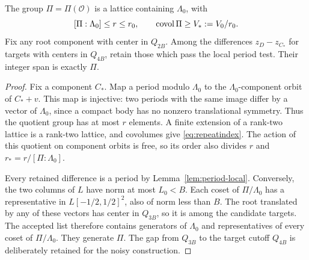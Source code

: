 \begin{lemma}
\label{lem:repeatgroup}
The group $\Pi=\Pi(\mathcal O)$ is a lattice containing $\Lambda_0$,
with
\begin{equation}\label{eq:repeatindex}
              [\Pi:\Lambda_0]\le r\le r_0,
       \qquad \operatorname{covol}\Pi\ge V_*:=V_0/r_0.
\end{equation}
Fix any root component with center in $Q_{2B}$. Among the differences
$z_D-z_{C_*}$ for targets with centers in $Q_{4B}$, retain those which
pass the local period test. Their integer span is exactly $\Pi$.
\end{lemma}
\begin{proof}
Fix a component $C_*$. Map a period modulo $\Lambda_0$ to the
$\Lambda_0$-component orbit of $C_*+v$. This map is injective: two periods
with the same image differ by a vector of $\Lambda_0$, since a compact
body has no nonzero translational symmetry. Thus the quotient group
has at most $r$ elements. A finite extension of a rank-two lattice is
a rank-two lattice, and covolumes give \eqref{eq:repeatindex}.
The action of this quotient on component orbits is free, so its order
also divides $r$ and $r_*=r/[\Pi:\Lambda_0]$.

Every retained difference is a period by Lemma~\ref{lem:period-local}.
Conversely, the two columns of $L$ have norm at most $L_0<B$.
Each coset of $\Pi/\Lambda_0$ has a representative in
$L[-1/2,1/2]^2$, also of norm less than $B$. The root translated by
any of these vectors has center in $Q_{3B}$, so it is among the
candidate targets. The accepted list therefore contains generators of
$\Lambda_0$ and representatives of every coset of $\Pi/\Lambda_0$.
They generate $\Pi$. The gap from $Q_{3B}$ to the target cutoff $Q_{4B}$
is deliberately retained for the noisy construction.
\end{proof}

